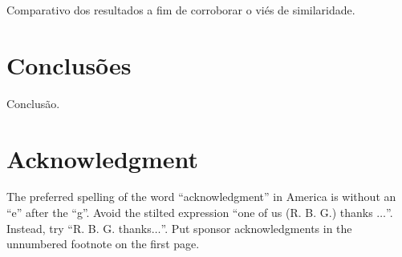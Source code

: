 \documentclass[conference]{IEEEtran}
\begin{document}
Comparativo dos resultados a fim de corroborar o viés de similaridade.

\section{Conclusões}

Conclusão.


\section*{Acknowledgment}

The preferred spelling of the word ``acknowledgment'' in America is without 
an ``e'' after the ``g''. Avoid the stilted expression ``one of us (R. B. 
G.) thanks $\ldots$''. Instead, try ``R. B. G. thanks$\ldots$''. Put sponsor 
acknowledgments in the unnumbered footnote on the first page.
\end{document}
